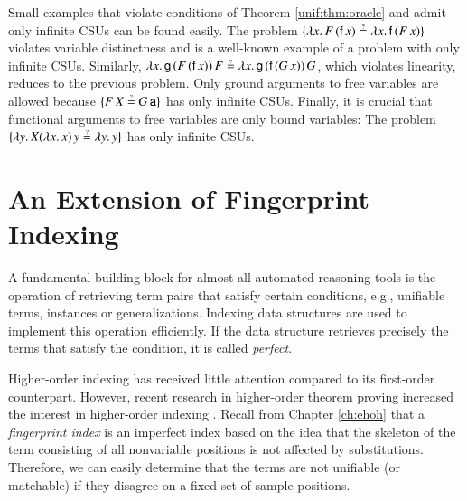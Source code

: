 Small examples that violate conditions of Theorem \ref{unif:thm:oracle} 
and admit only infinite CSUs can be found easily. The problem $\{ \lambda x.\, F \, (\cst{f} \, x) \unif \lambda x.\, \cst{f} \,
(F \, x) \}$ violates variable distinctness and is a well-known example of a problem with only infinite CSUs.
Similarly,
$\lambda x.\, \cst{g} \, (F \, (\cst{f} \, x)) \, F  \unif \lambda x.\, \cst{g}
\, (\cst{f} \, (G \, x)) \, G $, which violates linearity, reduces to the previous problem. 
Only ground arguments to free variables are allowed because  $\{F \, X \unif G
\, \cst{a}\}$ has only infinite CSUs. Finally, it is crucial that
functional arguments to free variables are only bound variables: The problem
$\{ \lambda y. \, X (\lambda x.\, x) \, y \unif \lambda y. \, y \}$ has only infinite CSUs.



\section{An Extension of Fingerprint Indexing}
\label{sec:unif:indexing}

A fundamental building block for almost all automated reasoning tools is the
operation of retrieving term pairs that satisfy certain conditions, e.g.,
unifiable terms, instances or generalizations. Indexing data structures are used
to implement this operation efficiently. If the data structure retrieves
precisely the terms that satisfy the condition, it is called \emph{perfect}.

Higher-order indexing has received little attention compared to its
first-order counterpart. However, recent research in higher-order theorem
proving increased the interest in higher-order indexing
\cite{ls-16-indexing,br-19-restricted-unif}.
Recall from Chapter \ref{ch:ehoh} that a \emph{fingerprint index} \cite{ss-12-fp-indexing} is an imperfect index based on
the idea that the skeleton of the term consisting of all nonvariable positions
is not affected by substitutions. Therefore, we can easily determine that the terms
are not unifiable (or matchable) if they disagree on a fixed set of sample
positions.

